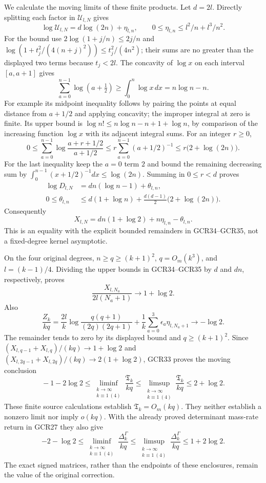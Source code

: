 We calculate the moving limits of these finite products.
Let $d=2l$. Directly splitting each factor in $\mathscr U_{l,N}$
gives
\[
 \log\mathscr U_{l,N}=d\log(2n)+\eta_{l,n},\qquad
 0\leq\eta_{l,n}\leq l^2/n+l^3/n^2.
\tag{GCR34}
\]
For the bound use
$2\log(1+j/n)\leq2j/n$ and
$\log(1+t_j^2/(4(n+j)^2))\leq t_j^2/(4n^2)$;
their sums are no greater than the displayed two terms because
$t_j<2l$.
The concavity of $\log x$ on each interval $[a,a+1]$ gives
\[
 \sum_{a=0}^{n-1}\log(a+\tfrac12)
       \geq\int_0^n\log x\,dx=n\log n-n.
\]
For example its midpoint inequality follows by pairing the
points at equal distance from $a+1/2$ and applying concavity;
the improper integral at zero is finite. Its upper bound is
$\log n!\leq n\log n-n+1+\log n$, by comparison of the
increasing function $\log x$ with its adjacent integral sums.
For an integer $r\geq0$,
\[
 0\leq\sum_{a=0}^{n-1}
          \log\frac{a+r+1/2}{a+1/2}
   \leq r\sum_{a=0}^{n-1}(a+1/2)^{-1}
   \leq r\bigl(2+\log(2n)\bigr).
\]
For the last inequality keep the $a=0$ term $2$ and bound the
remaining decreasing sum by
$\int_0^{n-1}(x+1/2)^{-1}dx\leq\log(2n)$.
Summing in $0\leq r<d$ proves
\[
\begin{split}
 \log D_{l,N}&=dn(\log n-1)+\theta_{l,n},\\
 0\leq\theta_{l,n}
 &\leq d(1+\log n)
       +\tfrac{d(d-1)}2\bigl(2+\log(2n)\bigr).
\end{split}\tag{GCR35}
\]
Consequently
\[
 X_{l,N}=dn(1+\log2)+n\eta_{l,n}-\theta_{l,n}.
\tag{GCR36}
\]
This is an equality with the explicit bounded remainders in
GCR34--GCR35, not a fixed-degree kernel asymptotic.

On the four original degrees, $n\geq q\geq(k+1)^2$,
$q=O_m(k^3)$, and $l=(k-1)/4$. Dividing the upper bounds
in GCR34--GCR35 by $d$ and $dn$, respectively, proves
\[
 \frac{X_{l,N_a}}{2l(N_a+1)}\longrightarrow1+\log2.
\tag{GCR37}
\]
Also
\[
 \frac{Z_k}{kq}
 =\frac{2l}{k}\log
       \frac{q(q+1)}{(2q)(2q+1)}
      +\frac1k\sum_{a=0}^3\epsilon_a\eta_{l,N_a+1}
       \longrightarrow-\log2.
\tag{GCR38}
\]
The remainder tends to zero by its displayed bound and
$q\geq(k+1)^2$. Since
$(X_{l,q-1}+X_{l,q})/(kq)\to1+\log2$ and
$(X_{l,2q-1}+X_{l,2q})/(kq)\to2(1+\log2)$,
GCR33 proves the moving conclusion
\[
 \boxed{\quad
 -1-2\log2
 \leq\liminf_{\substack{k\to\infty\\k\equiv1\ (4)}}
              \frac{\mathfrak T_k}{kq}
 \leq\limsup_{\substack{k\to\infty\\k\equiv1\ (4)}}
              \frac{\mathfrak T_k}{kq}
 \leq2+\log2.
 \quad}\tag{GCR39}
\]
These finite source calculations establish
$\mathfrak T_k=O_m(kq)$. They neither establish a nonzero
limit nor imply $o(kq)$. With the already proved determinant
mass-rate return in GCR27 they also give
\[
 -2-\log2
 \leq\liminf_{\substack{k\to\infty\\k\equiv1\ (4)}}
            \frac{\Delta_k^\Gamma}{kq}
 \leq\limsup_{\substack{k\to\infty\\k\equiv1\ (4)}}
            \frac{\Delta_k^\Gamma}{kq}
 \leq1+2\log2.
\tag{GCR40}
\]
The exact signed matrices, rather than the endpoints of these
enclosures, remain the value of the original correction.

